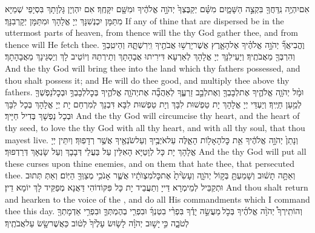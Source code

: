 {אִם\maqqaf יִהְיֶ֥ה נִֽדַּחֲךָ֖ בִּקְצֵ֣ה הַשָּׁמָ֑יִם מִשָּׁ֗ם יְקַבֶּצְךָ֙ יְהֹוָ֣ה אֱלֹהֶ֔יךָ וּמִשָּׁ֖ם יִקָּחֶֽךָ׃}
{אִם יִהְוְיָן גָּלְוָתָךְ בִּסְיָפֵי שְׁמַיָּא מִתַּמָּן יִכְנְשִׁנָּךְ יְיָ אֱלָהָךְ וּמִתַּמָּן יְקָרְבִנָּךְ׃}
{If any of thine that are dispersed be in the uttermost parts of heaven, from thence will the \lord\space thy God gather thee, and from thence will He fetch thee.}{}
{וֶהֱבִיאֲךָ֞ יְהֹוָ֣ה אֱלֹהֶ֗יךָ אֶל\maqqaf הָאָ֛רֶץ אֲשֶׁר\maqqaf יָרְשׁ֥וּ אֲבֹתֶ֖יךָ וִֽירִשְׁתָּ֑הּ וְהֵיטִֽבְךָ֥ וְהִרְבְּךָ֖ מֵאֲבֹתֶֽיךָ׃}
{וְיַעֵילִנָּךְ יְיָ אֱלָהָךְ לְאַרְעָא דִּירִיתוּ אֲבָהָתָךְ וְתֵירְתַהּ וְיוֹטֵיב לָךְ וְיַסְגֵּינָךְ מֵאֲבָהָתָךְ׃}
{And the \lord\space thy God will bring thee into the land which thy fathers possessed, and thou shalt possess it; and He will do thee good, and multiply thee above thy fathers.}{}
{וּמָ֨ל יְהֹוָ֧ה אֱלֹהֶ֛יךָ אֶת\maqqaf לְבָבְךָ֖ וְאֶת\maqqaf לְבַ֣ב זַרְעֶ֑ךָ לְאַהֲבָ֞ה אֶת\maqqaf יְהֹוָ֧ה אֱלֹהֶ֛יךָ בְּכׇל\maqqaf לְבָבְךָ֥ וּבְכׇל\maqqaf נַפְשְׁךָ֖ לְמַ֥עַן חַיֶּֽיךָ׃}
{וְיַעְדֵּי יְיָ אֱלָהָךְ יָת טַפְשׁוּת לִבָּךְ וְיָת טַפְשׁוּת לִבָּא דִּבְנָךְ לְמִרְחַם יָת יְיָ אֱלָהָךְ בְּכָל לִבָּךְ וּבְכָל נַפְשָׁךְ בְּדִיל חַיָּיךְ׃}
{And the \lord\space thy God will circumcise thy heart, and the heart of thy seed, to love the \lord\space thy God with all thy heart, and with all thy soul, that thou mayest live.}{}
{וְנָתַן֙ יְהֹוָ֣ה אֱלֹהֶ֔יךָ אֵ֥ת כׇּל\maqqaf הָאָל֖וֹת הָאֵ֑לֶּה עַל\maqqaf אֹיְבֶ֥יךָ וְעַל\maqqaf שֹׂנְאֶ֖יךָ אֲשֶׁ֥ר רְדָפֽוּךָ׃}
{וְיִתֵּין יְיָ אֱלָהָךְ יָת כָּל לְוָטַיָּא הָאִלֵּין עַל בַּעֲלֵי דְּבָבָךְ וְעַל שָׂנְאָךְ דְּרַדְפוּךְ׃}
{And the \lord\space thy God will put all these curses upon thine enemies, and on them that hate thee, that persecuted thee.}{}
{וְאַתָּ֣ה תָשׁ֔וּב וְשָׁמַעְתָּ֖ בְּק֣וֹל יְהֹוָ֑ה וְעָשִׂ֙יתָ֙ אֶת\maqqaf כׇּל\maqqaf מִצְוֺתָ֔יו אֲשֶׁ֛ר אָנֹכִ֥י מְצַוְּךָ֖ הַיּֽוֹם׃}
{וְאַתְּ תְּתוּב וּתְקַבֵּיל לְמֵימְרָא דַּייָ וְתַעֲבֵיד יָת כָּל פִּקּוֹדוֹהִי דַּאֲנָא מְפַקֵּיד לָךְ יוֹמָא דֵין׃}
{And thou shalt return and hearken to the voice of the \lord, and do all His commandments which I command thee this day.}{}
{וְהוֹתִֽירְךָ֩ יְהֹוָ֨ה אֱלֹהֶ֜יךָ בְּכֹ֣ל \legarmeh  מַעֲשֵׂ֣ה יָדֶ֗ךָ בִּפְרִ֨י בִטְנְךָ֜ וּבִפְרִ֧י בְהֶמְתְּךָ֛ וּבִפְרִ֥י אַדְמָתְךָ֖ לְטֹבָ֑ה כִּ֣י \legarmeh  יָשׁ֣וּב יְהֹוָ֗ה לָשׂ֤וּשׂ עָלֶ֙יךָ֙ לְט֔וֹב כַּאֲשֶׁר\maqqaf שָׂ֖שׂ עַל\maqqaf אֲבֹתֶֽיךָ׃}
